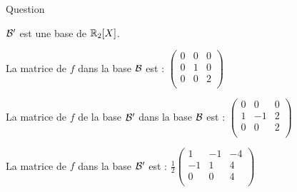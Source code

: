 \begin{multi}[multiple,feedback=
{La matrice de \(f\) d'une base \({\cal {B}}=(u_j)\) dans une  base \( {\cal {B}}'=(v_i)\) est la matrice  dont la \(j\)ième colonne est constituée des coordonnées de  \(f(u_j)\) dans la base \( {\cal {B}}'\). La matrice de \(f\) dans la base \( {\cal {B'}}\) est : \(
\frac{1}{2}\left(\begin{array}{rcc}
1&-1&-4\\
-1&1&0\\ 
0&0&4\\
\end{array}\right).\)
}]{Question}
    \item* \({\cal {B'}}\) est une base de  \(\mathbb{R}_2[X]\).
    \item* La matrice de \(f\) dans la base \( {\cal {B}}\) est : \(
\left(\begin{array}{rcc}
0&0&0\\
0&1&0\\
0&0&2\\
\end{array}\right)\)
    \item* La matrice de \(f\) de la base \( {\cal {B'}}\) dans la base \( {\cal {B}}\) est : \(
\left(\begin{array}{rcc}
0&0&0\\
1&-1&2\\
0&0&2\\
\end{array}\right)\)
    \item La matrice de \(f\) dans la base \( {\cal {B'}}\) est : \(
\frac{1}{2}\left(\begin{array}{rcc}
1&-1&-4\\
-1&1&4\\
0&0&4\\
\end{array}\right)\)
\end{multi}


